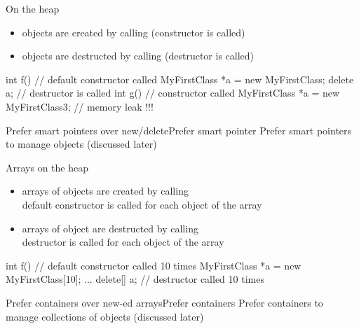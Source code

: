 \begin{frame}[fragile]
  \begin{block}{On the heap}
    \begin{itemize}
    \item objects are created by calling  (constructor is called)
    \item objects are destructed by calling  (destructor is called)
    \end{itemize}
  \end{block}
  \begin{cppcode}
    int f() {
      // default constructor called
      MyFirstClass *a = new MyFirstClass;
      delete a; // destructor is called
    }
    int g() {
      // constructor called
      MyFirstClass *a = new MyFirstClass{3};
    } // memory leak !!!
  \end{cppcode}
  \begin{goodpracticeWithShortcut}{Prefer smart pointers over new/delete}{Prefer smart pointer}
    Prefer smart pointers to manage objects (discussed later)
  \end{goodpracticeWithShortcut}
\end{frame}

\begin{frame}[fragile]
  \begin{block}{Arrays on the heap}
    \begin{itemize}
    \item arrays of objects are created by calling  \\
      default constructor is called for each object of the array
    \item arrays of object are destructed by calling  \\
      destructor is called for each object of the array
    \end{itemize}
  \end{block}
  \begin{cppcode}
    int f() {
      // default constructor called 10 times
      MyFirstClass *a = new MyFirstClass[10];
      ...
      delete[] a; // destructor called 10 times
    }
  \end{cppcode}
  \begin{goodpracticeWithShortcut}{Prefer containers over new-ed arrays}{Prefer containers}
    Prefer containers to manage collections of objects (discussed later)
  \end{goodpracticeWithShortcut}
\end{frame}

